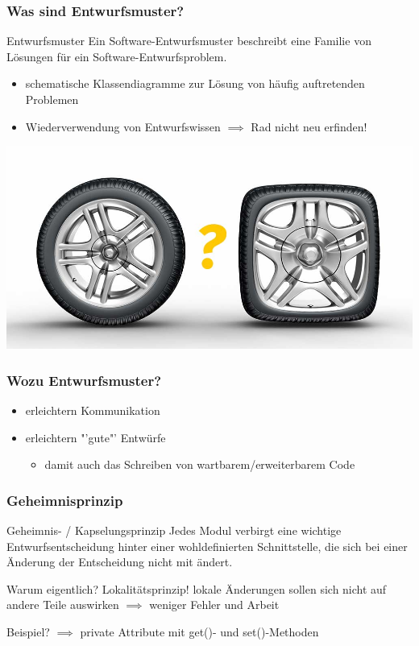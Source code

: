 \documentclass[18pt]{beamer}
\begin{document}
	\begin{frame}
		\frametitle{Was sind Entwurfsmuster?}
		\begin{block}{Entwurfsmuster}
			Ein Software-Entwurfsmuster beschreibt eine
			Familie von Lösungen für ein Software-Entwurfsproblem.
		\end{block}
		\pause
		\begin{itemize}
			\item schematische Klassendiagramme zur Lösung von häufig auftretenden Problemen \pause
			\item Wiederverwendung von Entwurfswissen $\implies$ Rad nicht neu erfinden!
		\end{itemize}
		\pause
		\centering
		\includegraphics[scale=0.2]{./pics/tut3/new-wheel.jpg}
	\end{frame}

	\begin{frame}
		\frametitle{Wozu Entwurfsmuster?}
		\begin{itemize}
			\item erleichtern Kommunikation \pause
			\item erleichtern "'gute"' Entwürfe 
			\begin{itemize}
				\item damit auch das Schreiben von wartbarem/erweiterbarem Code
			\end{itemize}
		\end{itemize}
\end{frame}
	
	\begin{frame}
		\frametitle{Geheimnisprinzip}
		\begin{block}{Geheimnis- / 
				Kapselungsprinzip}
			Jedes Modul verbirgt eine wichtige
			Entwurfsentscheidung hinter einer
			wohldefinierten Schnittstelle, die sich bei einer
			Änderung der Entscheidung nicht mit ändert.
		\end{block}
		\pause
		\begin{alertblock}{Warum eigentlich? Lokalitätsprinzip!}
			lokale Änderungen sollen sich nicht auf andere Teile auswirken 
			\linebreak $\implies$ weniger Fehler und Arbeit
		\end{alertblock}
		Beispiel? \pause $\implies$ private Attribute mit get()- und set()-Methoden
	\end{frame}
\end{document}
